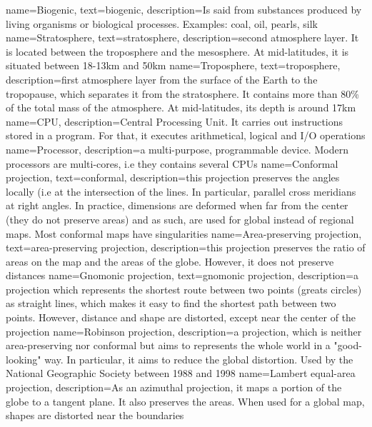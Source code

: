{
  name={Biogenic},
  text={biogenic},
  description={Is said from substances produced by living organisms or
  biological processes. Examples: coal, oil, pearls, silk}
}
{
  name={Stratosphere},
  text={stratosphere},
  description={second atmosphere layer. It is located between the troposphere
  and the mesosphere. At mid-latitudes, it is situated between 18-13km and
  50km}
}
{
  name={Troposphere},
  text={troposphere},
  description={first atmosphere layer from the surface of the Earth to the
  tropopause, which separates it from the stratosphere. It contains more than
  80\% of the total mass of the atmosphere. At mid-latitudes, its depth is
  around 17km}
}
{
  name=CPU,
  description={Central Processing Unit. It carries out instructions
  stored in a program. For that, it executes arithmetical, logical and I/O
  operations}
}
{
  name=Processor,
  description={a multi-purpose, programmable device.  Modern processors are
  multi-cores, i.e they contains several CPUs}
}
{
  name={Conformal projection},
  text={conformal},
  description={this projection preserves the angles locally (i.e at the
  intersection of the lines. In particular, parallel cross meridians at right
  angles. In practice, dimensions are deformed when far from the center (they
  do not preserve areas) and as such, are used for global instead of regional
  maps. Most conformal maps have singularities}
}
{
  name={Area-preserving projection},
  text={area-preserving projection},
  description={this projection preserves the ratio of areas on the map and the
  areas of the globe. However, it does not preserve distances}
}
{
  name={Gnomonic projection},
  text={gnomonic projection},
  description={a projection which represents the shortest route between two
  points (greats circles) as straight lines, which makes it easy to find the
  shortest path between two points. However, distance and shape are distorted,
  except near the center of the projection}
}
{
  name={Robinson projection},
  description={a projection, which is neither area-preserving nor conformal but
  aims to represents the whole world in a "good-looking" way. In particular, it
  aims to reduce the global distortion. Used by the National Geographic Society
  between 1988 and 1998}
}
{
  name={Lambert equal-area projection},
  description={As an azimuthal projection, it maps a portion of the globe to
  a tangent plane. It also preserves the areas. When used for a global map,
  shapes are distorted near the boundaries}
}

